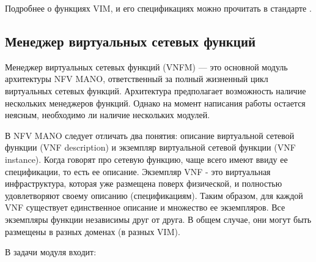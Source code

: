 \documentclass[oneside,final,14pt,a4paper]{extreport}
\begin{document}
Подробнее о функциях VIM, и его спецификациях можно прочитать в стандарте \cite{nfv-mano-official-2016-04}.

\subsection{Менеджер виртуальных сетевых функций}
Менеджер виртуальных сетевых функций (VNFM) --- это основной модуль архитектуры NFV MANO, ответственный за  полный жизненный цикл виртуальных сетевых функций. Архитектура предполагает возможность наличие нескольких менеджеров функций. Однако на момент написания работы остается неясным, необходимо ли наличие нескольких модулей.

В NFV MANO следует отличать два понятия: описание виртуальной сетевой функции (VNF description) и экземпляр виртуальной сетевой функции (VNF instance). Когда говорят про сетевую функцию, чаще всего имеют ввиду ее спецификации, то есть ее описание. Экземпляр VNF - это виртуальная инфраструктура, которая уже размещена поверх физической, и полностью удовлетворяют своему описанию (спецификациям). Таким образом, для каждой VNF существует единственное описание и множество ее экземпляров. Все экземпляры функции независимы друг от друга. В общем случае, они могут быть размещены в разных доменах (в разных VIM).

В задачи модуля входит:
\end{document}
